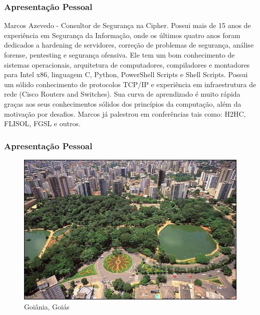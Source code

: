 \documentclass[compress]{beamer}
\begin{document}

\begin{frame}
\frametitle{Apresentação Pessoal}
	\justifying
		Marcos Azevedo - Consultor de Segurança na Cipher. Possui mais de 15 anos de experiência em Segurança da Informação, onde os últimos quatro anos foram dedicados a hardening de servidores, correção de problemas de segurança, análise forense, pentesting e segurança ofensiva. Ele tem um bom conhecimento de sistemas operacionais, arquitetura de computadores, compiladores e montadores para Intel x86, linguagem C, Python, PowerShell Scripts e Shell Scripts. Possui um sólido conhecimento de protocolos TCP/IP e experiência em infraestrutura de rede (Cisco Routers and Switches). Sua curva de aprendizado é muito rápida graças aos seus conhecimentos sólidos dos princípios da computação, além da motivação por desafios. Marcos já palestrou em conferências tais como: H2HC, FLISOL, FGSL e outros.
\end{frame}

\begin{frame}
\frametitle{Apresentação Pessoal}
	\begin{figure}[h]
		\caption{Goiânia, Goiás}
		\includegraphics[width=\textwidth]{pics/goiania}
	\end{figure}
\end{frame}
\end{document}
